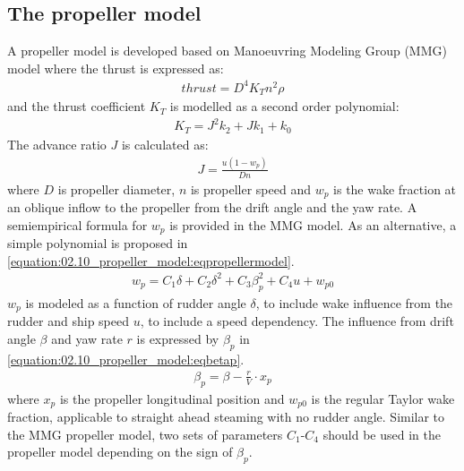 \subsection{The propeller model}
\label{\detokenize{02.10_propeller_model:the-propeller-model}}\label{\detokenize{02.10_propeller_model::doc}}
\sphinxAtStartPar
A propeller model is developed based on Manoeuvring Modeling Group (MMG) model \cite{yasukawa_introduction_2015-1} where the thrust is expressed as:
\begin{equation}\label{equation:02.10_propeller_model:eqT}
\begin{split}\displaystyle thrust = D^{4} K_{T} n^{2} \rho\end{split}
\end{equation}
\sphinxAtStartPar
and the thrust coefficient \(K_T\) is modelled as a second order polynomial:
\begin{equation}\label{equation:02.10_propeller_model:eqkt}
\begin{split}\displaystyle K_{T} = J^{2} k_{2} + J k_{1} + k_{0}\end{split}
\end{equation}
\sphinxAtStartPar
The advance ratio \(J\) is calculated as:
\begin{equation}\label{equation:02.10_propeller_model:eqJ}
\begin{split}\displaystyle J = \frac{u \left(1 - w_{p}\right)}{D n}\end{split}
\end{equation}
\sphinxAtStartPar
where \(D\) is propeller diameter, \(n\) is propeller speed and \(w_p\) is the wake fraction at an oblique inflow to the propeller from the drift angle and the yaw rate. A semi\sphinxhyphen{}empirical formula for \(w_p\) is provided in the MMG model. As an alternative, a simple polynomial is proposed in \autoref{equation:02.10_propeller_model:eqpropellermodel}.
\begin{equation}\label{equation:02.10_propeller_model:eqpropellermodel}
\begin{split}\displaystyle w_{p} = C_{1} \delta + C_{2} \delta^{2} + C_{3} \beta_{p}^{2} + C_{4} u + w_{p0}\end{split}
\end{equation}
\sphinxAtStartPar
\(w_p\) is modeled as a function of rudder angle \(\delta\), to include wake influence from the rudder and ship speed \(u\), to include a speed dependency. The influence from drift angle \(\beta\) and yaw rate \(r\) is expressed by \(\beta_p\) in \autoref{equation:02.10_propeller_model:eqbetap}.
\begin{equation}\label{equation:02.10_propeller_model:eqbetap}
\begin{split}\beta_p=\beta - \frac{r}{V} \cdot x_p \end{split}
\end{equation}
where \(x_p\) is the propeller longitudinal position and \(w_{p0}\) is the regular Taylor wake fraction, applicable to straight ahead steaming with no rudder angle. Similar to the MMG propeller model, two sets of parameters \(C_1\)-\(C_4\) should be used in the propeller model depending on the sign of \(\beta_p\).